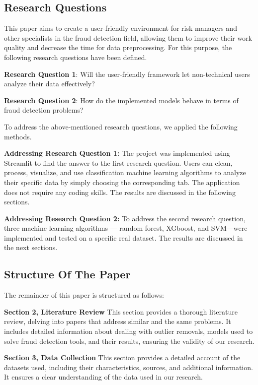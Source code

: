 \documentclass[a4paper,twocolumn,12pt]{article}
\begin{document}
 
\subsection{Research Questions}

This paper aims to create a user-friendly environment for risk managers and other specialists in the fraud detection field, allowing them to improve their work quality and decrease the time for data preprocessing. For this purpose, the following research questions have been defined.

\textbf{Research Question 1}: Will the user-friendly framework let non-technical users analyze their data effectively?

\textbf{Research Question 2}: How do the implemented models behave in terms of fraud detection problems?

To address the above-mentioned research questions, we applied the following methods.

\textbf{Addressing Research Question 1:} The project was implemented using Streamlit to find the answer to the first research question. Users can clean, process, visualize, and use classification machine learning algorithms to analyze their specific data by simply choosing the corresponding tab. The application does not require any coding skills. The results are discussed in the following sections. 

\textbf{Addressing Research Question 2:} To address the second research question, three machine learning algorithms — random forest, XGboost, and SVM—were implemented and tested on a specific real dataset. The results are discussed in the next sections. 


\subsection{Structure Of The Paper}

The remainder of this paper is structured as follows:

\textbf{Section 2, Literature Review} This section provides a thorough literature review, delving into papers that address similar and the same problems. It includes detailed information about dealing with outlier removals, models used to solve fraud detection tools, and their results, ensuring the validity of our research. 


\textbf{Section 3, Data Collection} This section provides a detailed account of the datasets used, including their characteristics, sources, and additional information. It ensures a clear understanding of the data used in our research. 
\end{document}
